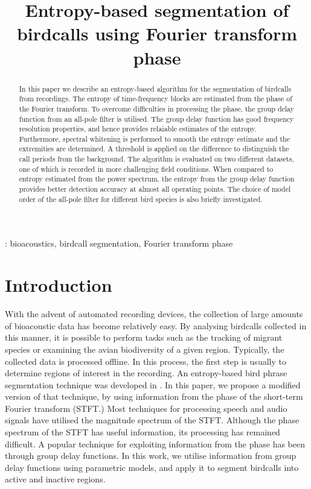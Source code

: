 \documentclass[a4paper]{article}
\title{Entropy-based segmentation of birdcalls using Fourier transform phase}
\begin{document}
  \maketitle
  \begin{abstract}
  In this paper we describe an entropy-based algorithm for the segmentation of
  birdcalls from recordings. The entropy of time-frequency blocks are estimated
  from the phase of the Fourier transform. To overcome difficulties in
  processing the phase, the group delay function from an all-pole filter is
  utilised. The group delay function has good frequency resolution properties,
  and hence provides relaiable estimates of the entropy. Furthermore, spectral
  whitening is performed to smooth the entropy estimate and the extremities are
  determined. A threshold is applied on the difference to distinguish the call
  periods from the background.  The algorithm is evaluated on two different
  datasets, one of which is recorded in more challenging field conditions. When
  compared to entropy estimated from the power spectrum, the entropy from the
  group delay function provides better detection accuracy at almost all
  operating points. The choice of model order of the all-pole filter for
  different bird species is also briefly investigated.
  \end{abstract}
  : bioacoustics, birdcall segmentation, Fourier transform phase
  



\section{Introduction}

With the advent of automated recording devices, the collection of large amounts of
bioacoustic data has become relatively easy. By analysing birdcalls collected in
this manner, it is possible to perform tasks such as the tracking of migrant
species or examining the avian biodiversity of a given region. Typically, the
collected data is processed offline. In this process, the first step is usually to
determine regions of interest in the recording. An entropy-based bird phrase segmentation
technique was developed in \cite{wang2013}. In this paper, we propose a modified
version of that technique, by using information from the phase of the short-term
Fourier transform (STFT.) Most techniques for processing speech and audio signals have
utilised the magnitude spectrum of the STFT. Although the phase spectrum of the STFT has 
useful information, its processing has remained difficult. A popular technique
for exploiting information from the phase has been through group delay functions. In
this work, we utilise information from group delay functions using parametric
models, and apply it to segment birdcalls into active and inactive regions.
\end{document}
